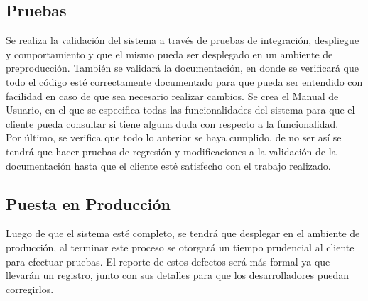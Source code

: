 \subsection*{Pruebas}

Se realiza la validación del sistema a través de pruebas de integración, despliegue y comportamiento y que el mismo pueda ser desplegado en un ambiente de preproducción. También se validará la documentación, en donde se verificará que todo el código esté correctamente documentado para que pueda ser entendido con facilidad en caso de que sea necesario realizar cambios. Se crea el Manual de Usuario, en el que se especifica todas las funcionalidades del sistema para que el cliente pueda consultar si tiene alguna duda con respecto a la funcionalidad.\\

Por último, se verifica que todo lo anterior se haya cumplido, de no ser así se tendrá que hacer pruebas de regresión y modificaciones a la validación de la documentación hasta que el cliente esté  satisfecho con el trabajo realizado.

\subsection*{Puesta en Producción}

Luego de que el sistema esté completo, se tendrá que desplegar en el ambiente de producción, al terminar este proceso se otorgará un tiempo prudencial al cliente para efectuar pruebas. El reporte de estos defectos será más formal ya que llevarán un registro, junto con sus detalles para que los desarrolladores puedan corregirlos.



